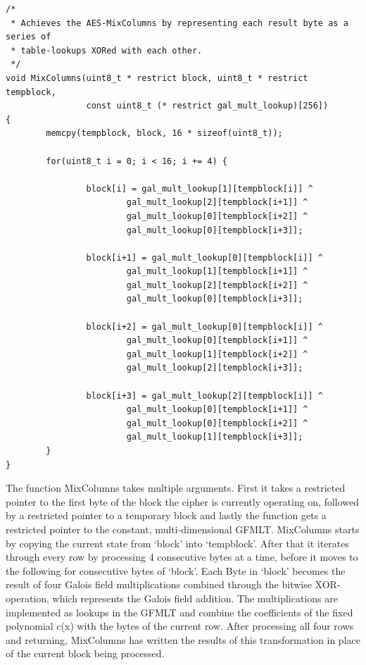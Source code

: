 \begin{lstlisting}
/*
 * Achieves the AES-MixColumns by representing each result byte as a series of
 * table-lookups XORed with each other.
 */
void MixColumns(uint8_t * restrict block, uint8_t * restrict tempblock, 
                const uint8_t (* restrict gal_mult_lookup)[256])
{
        memcpy(tempblock, block, 16 * sizeof(uint8_t));

        for(uint8_t i = 0; i < 16; i += 4) {

                block[i] = gal_mult_lookup[1][tempblock[i]] ^
                        gal_mult_lookup[2][tempblock[i+1]] ^
                        gal_mult_lookup[0][tempblock[i+2]] ^
                        gal_mult_lookup[0][tempblock[i+3]];

                block[i+1] = gal_mult_lookup[0][tempblock[i]] ^
                        gal_mult_lookup[1][tempblock[i+1]] ^
                        gal_mult_lookup[2][tempblock[i+2]] ^
                        gal_mult_lookup[0][tempblock[i+3]];

                block[i+2] = gal_mult_lookup[0][tempblock[i]] ^
                        gal_mult_lookup[0][tempblock[i+1]] ^
                        gal_mult_lookup[1][tempblock[i+2]] ^
                        gal_mult_lookup[2][tempblock[i+3]];

                block[i+3] = gal_mult_lookup[2][tempblock[i]] ^
                        gal_mult_lookup[0][tempblock[i+1]] ^
                        gal_mult_lookup[0][tempblock[i+2]] ^
                        gal_mult_lookup[1][tempblock[i+3]];
        }
}
\end{lstlisting}

The function MixColumns takes multiple arguments. First it takes a
restricted pointer to the first byte of the block the cipher is
currently operating on, followed by a restricted pointer to a temporary
block and lastly the function gets a restricted pointer to the constant,
multi-dimensional GFMLT. MixColumns starts by copying the current state
from `block' into `tempblock'. After that it iterates through every row
by processing 4 consecutive bytes at a time, before it moves to the
following for consecutive bytes of `block'. Each Byte in `block' becomes
the result of four Galois field multiplications combined through the
bitwise XOR-operation, which represents the Galois field addition. The
multiplications are implemented as lookups in the GFMLT and combine the
coefficients of the fixed polynomial c(x) with the bytes of the current
row. After processing all four rows and returning, MixColumns has
written the results of this transformation in place of the current block
being processed.

